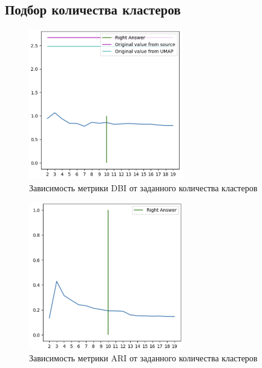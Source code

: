 \FloatBarrier

\subsection{Подбор количества кластеров}

\begin{figure}
	\begin{center}
		\includegraphics[width=0.6\textwidth]{images/10.png}
	\end{center}
	\caption{Зависимость метрики DBI от заданного количества кластеров}
	\label{img:8}
\end{figure}

\begin{figure}
	\begin{center}
		\includegraphics[width=0.6\textwidth]{images/11.png}
	\end{center}
	\caption{Зависимость метрики ARI от заданного количества кластеров}
	\label{img:9}
\end{figure}

